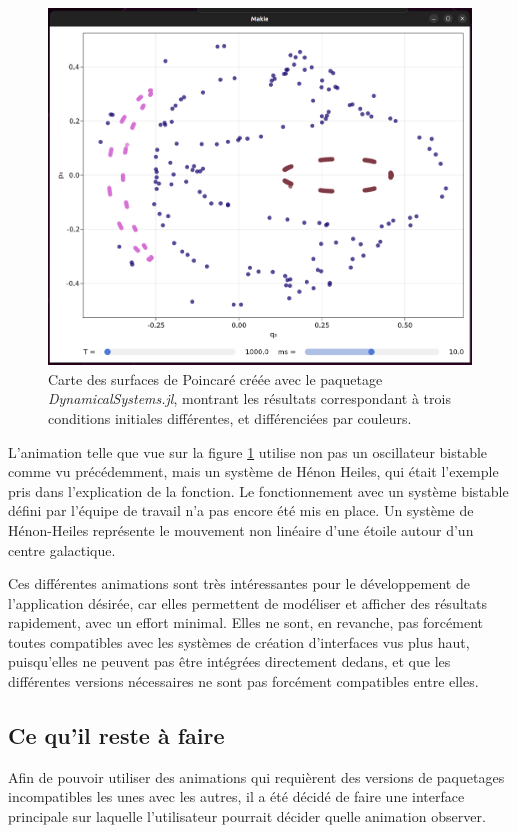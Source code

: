 \documentclass[a4paper, french, 12pt, titlepage]{article}
\begin{document}
\begin{figure}[H]
  \begin{center}
    \includegraphics[width=0.7\linewidth]{poincaremap_2.png}
    \caption{Carte des surfaces de Poincaré créée avec le paquetage \emph{DynamicalSystems.jl}, montrant les résultats correspondant à trois conditions initiales différentes, et différenciées par couleurs.}
    \label{fig:fig17}
  \end{center}
\end{figure}

L'animation telle que vue sur la figure \ref{fig:fig17} utilise non pas un oscillateur bistable comme vu précédemment, mais un système de Hénon Heiles, qui était l'exemple pris dans l'explication de la fonction.
Le fonctionnement avec un système bistable défini par l'équipe de travail n'a pas encore été mis en place.
Un système de Hénon-Heiles représente le mouvement non linéaire d'une étoile autour d'un centre galactique. 

Ces différentes animations sont très intéressantes pour le développement de l'application désirée, car elles permettent de modéliser et afficher des résultats rapidement, avec un effort minimal.
Elles ne sont, en revanche, pas forcément toutes compatibles avec les systèmes de création d'interfaces vus plus haut, puisqu'elles ne peuvent pas être intégrées directement dedans, et que les différentes versions nécessaires ne sont pas forcément compatibles entre elles.


\subsection{Ce qu'il reste à faire}

Afin de pouvoir utiliser des animations qui requièrent des versions de paquetages incompatibles les unes avec les autres, il a été décidé de faire une interface principale sur laquelle l'utilisateur pourrait décider quelle animation observer. 
\end{document}
